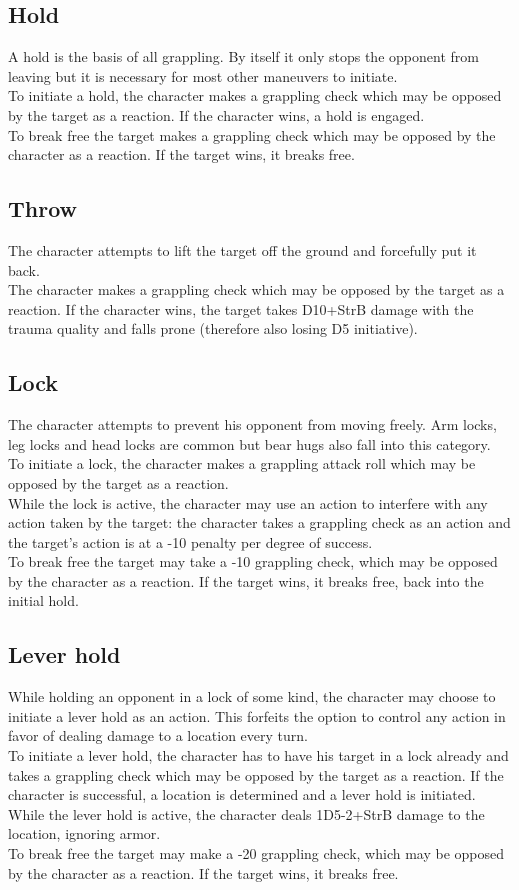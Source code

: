 \subsection*{Hold}
A hold is the basis of all grappling. By itself it only stops the opponent from leaving but it is necessary for most other maneuvers to initiate.\\
To initiate a hold, the character makes a grappling check which may be opposed by the target as a reaction. If the character wins, a hold is engaged.\\
To break free the target makes a grappling check which may be opposed by the character as a reaction. If the target wins, it breaks free.
\subsection*{Throw}
The character attempts to lift the target off the ground and forcefully put it back.\\
The character makes a grappling check which may be opposed by the target as a reaction. If the character wins, the target takes D10+StrB damage with the trauma quality and falls prone (therefore also losing D5 initiative).
\subsection*{Lock}
The character attempts to prevent his opponent from moving freely. Arm locks, leg locks and head locks are common but bear hugs also fall into this category.\\
To initiate a lock, the character makes a grappling attack roll which may be opposed by the target as a reaction.\\
While the lock is active, the character may use an action to interfere with any action taken by the target: the character takes a grappling check as an action and the target’s action is at a -10 penalty per degree of success.\\
To break free the target may take a -10 grappling check, which may be opposed by the character as a reaction. If the target wins, it breaks free, back into the initial hold.
\subsection*{Lever hold}
While holding an opponent in a lock of some kind, the character may choose to initiate a lever hold as an action. This forfeits the option to control any action in favor of dealing damage to a location every turn.\\
To initiate a lever hold, the character has to have his target in a lock already and takes a grappling check which may be opposed by the target as a reaction. If the character is successful, a location is determined and a lever hold is initiated.\\
While the lever hold is active, the character deals 1D5-2+StrB damage to the location, ignoring armor.\\
To break free the target may make a -20 grappling check, which may be opposed by the character as a reaction. If the target wins, it breaks free.
